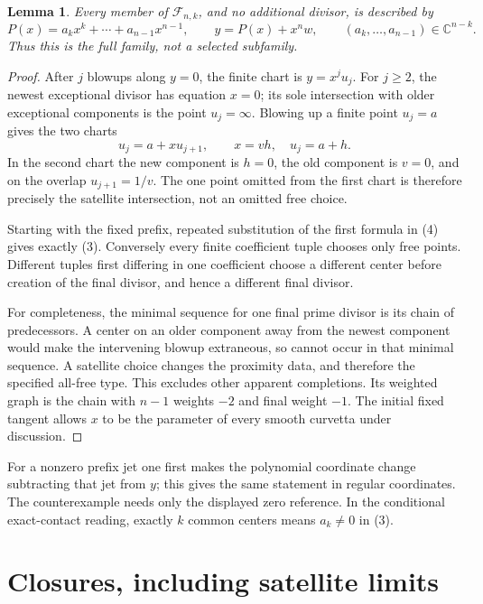 \documentclass[11pt]{article}
\newtheorem{lemma}[theorem]{Lemma}
\newcommand{\C}{\mathbb C}
\begin{document}
\begin{lemma}\label{lem:family}
Every member of \(\mathcal F_{n,k}\), and no additional divisor, is
described by
\[
 P(x)=a_kx^k+\cdots+a_{n-1}x^{n-1},\qquad
 y=P(x)+x^n w,\qquad (a_k,\ldots,a_{n-1})\in\C^{n-k}.       \tag{3}
 \label{eq:family}
\]
Thus this is the full family, not a selected subfamily.
\end{lemma}

\begin{proof}
After \(j\) blowups along \(y=0\), the finite chart is \(y=x^j u_j\).
For \(j\geq2\), the newest exceptional divisor has equation \(x=0\);
its sole intersection with older exceptional components is the point
\(u_j=\infty\). Blowing up a finite point \(u_j=a\) gives the two charts
\[
 u_j=a+xu_{j+1},\qquad
 x=vh,\quad u_j=a+h.                                      \tag{4}
\]
In the second chart the new component is \(h=0\), the old component is
\(v=0\), and on the overlap \(u_{j+1}=1/v\).
The one point omitted from the first chart is therefore precisely the
satellite intersection, not an omitted free choice.

Starting with the fixed prefix, repeated substitution of the first
formula in (4) gives exactly (3). Conversely every finite coefficient
tuple chooses only free points. Different tuples first differing in
one coefficient choose a different center before creation of the final
divisor, and hence a different final divisor.

For completeness, the minimal sequence for one final prime divisor
is its chain of predecessors. A center on an older component away from
the newest component would make the intervening blowup extraneous,
so cannot occur in that minimal sequence. A satellite choice changes
the proximity data, and therefore the specified all-free type. This
excludes other apparent completions. Its weighted graph is the chain
with \(n-1\) weights \(-2\) and final weight \(-1\).
The initial fixed tangent allows \(x\) to be the parameter of every
smooth curvetta under discussion.
\end{proof}

For a nonzero prefix jet one first makes the polynomial coordinate
change subtracting that jet from \(y\); this gives the same statement
in regular coordinates. The counterexample needs only the displayed
zero reference. In the conditional exact-contact reading, exactly
\(k\) common centers means \(a_k\ne0\) in (3).

\section{Closures, including satellite limits}
\end{document}
